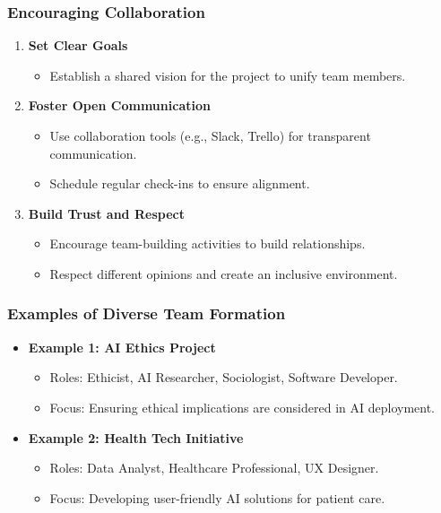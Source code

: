 \documentclass[aspectratio=169]{beamer}
\begin{document}
\begin{frame}[fragile]
    \frametitle{Encouraging Collaboration}

    \begin{enumerate}
        \item \textbf{Set Clear Goals}
        \begin{itemize}
            \item Establish a shared vision for the project to unify team members.
        \end{itemize}

        \item \textbf{Foster Open Communication}
        \begin{itemize}
            \item Use collaboration tools (e.g., Slack, Trello) for transparent communication.
            \item Schedule regular check-ins to ensure alignment.
        \end{itemize}

        \item \textbf{Build Trust and Respect}
        \begin{itemize}
            \item Encourage team-building activities to build relationships.
            \item Respect different opinions and create an inclusive environment.
        \end{itemize}
    \end{enumerate}
\end{frame}

\begin{frame}[fragile]
    \frametitle{Examples of Diverse Team Formation}

    \begin{itemize}
        \item \textbf{Example 1: AI Ethics Project}
        \begin{itemize}
            \item Roles: Ethicist, AI Researcher, Sociologist, Software Developer.
            \item Focus: Ensuring ethical implications are considered in AI deployment.
        \end{itemize}

        \item \textbf{Example 2: Health Tech Initiative}
        \begin{itemize}
            \item Roles: Data Analyst, Healthcare Professional, UX Designer.
            \item Focus: Developing user-friendly AI solutions for patient care.
        \end{itemize}
    \end{itemize}
\end{frame}
\end{document}
